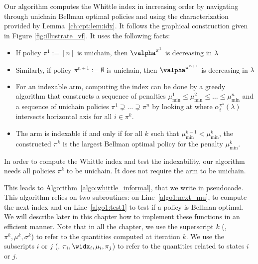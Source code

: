 Our algorithm computes the Whittle index in increasing order by navigating through unichain Bellman optimal policies and using the characterization provided by Lemma~\ref{ch:cpt:lem:idx}.
It follows the graphical construction given in Figure \ref{fig:illustrate_vf}. It uses the following facts:
\begin{itemize}
    \item If policy $\pi^1:=[n]$ is unichain, then $\valpha^{\pi^1}$ is decreasing in $\lambda$
    \item Similarly, if policy $\pi^{n+1}:=\emptyset$ is unichain, then $\valpha^{\pi^{n+1}}$ is decreasing in $\lambda$
    \item For an indexable arm, computing the index can be done by a greedy algorithm that constructs a sequence of penalties $\mu^1_{\min}\le\mu^2_{\min}\le\dots\le\mu^n_{\min}$ and a sequence of unichain policies $\pi^1\supsetneq\dots\supsetneq\pi^{n}$ by looking at where $\alpha^{\pi^k}_i(\lambda)$ intersects horizontal axis for all $i\in\pi^k$.
    \item The arm is indexable if and only if for all $k$ such that $\mu^{k-1}_{\min}<\mu^{k}_{\min}$, the constructed $\pi^k$ is the largest Bellman optimal policy for the penalty $\mu^k_{\min}$.
\end{itemize}
In order to compute the Whittle index and test the indexability, our algorithm needs all policies $\pi^k$ to be unichain.
It does not require the arm to be unichain. 

This leads to Algorithm~\ref{algo:whittle_informal}, that we write in pseudocode.
This algorithm relies on two subroutines: on Line~\ref{algo1:next_mu}, to compute the next index and on Line~\ref{algo1:test1} to test if a policy is Bellman optimal.
We will describe later in this chapter how to implement these functions in an efficient manner.
Note that in all the chapter, we use the superscript $k$ (\ie, $\pi^k, \mu^k, \sigma^k$) to refer to the quantities computed at iteration $k$.
We use the subscripts $i$ or $j$ (\ie, $\pi_i, \widx_i, \mu_i, \pi_j$) to refer to the quantities related to states $i$ or $j$.

